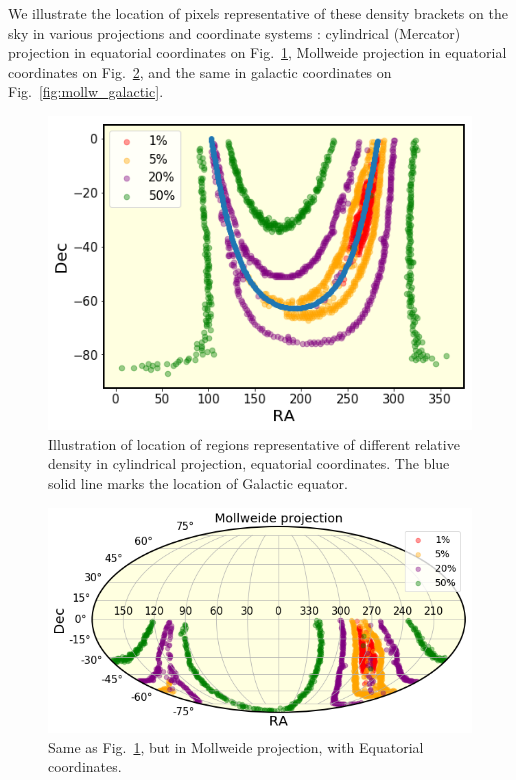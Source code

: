 \documentclass[DM,lsstdraft,toc,usenatbib]{lsstdoc}
\begin{document}
We illustrate the location of pixels representative of these density brackets on the sky in various projections  and coordinate systems :  cylindrical (Mercator) projection  in equatorial coordinates on Fig.~\ref{fig:cart_equat},  Mollweide projection in equatorial coordinates on Fig.~\ref{fig:mollw_equat},  and the same in galactic coordinates on Fig.~\ref{fig:mollw_galactic}. 


\begin{figure}
\includegraphics[width=1.0\columnwidth]{figs/Illustrate_density_regions.png}
\caption{Illustration of location of regions representative of different relative density in cylindrical projection, equatorial coordinates. The blue solid line marks the location of Galactic equator. }
\label{fig:cart_equat}
\end{figure} 



\begin{figure}
\includegraphics[width=1.0\columnwidth]{figs/Illustrate_density_regions_mollw.png}
\caption{Same as Fig.~\ref{fig:cart_equat}, but in Mollweide projection, with Equatorial coordinates.}
\label{fig:mollw_equat}
\end{figure} 
\end{document}
